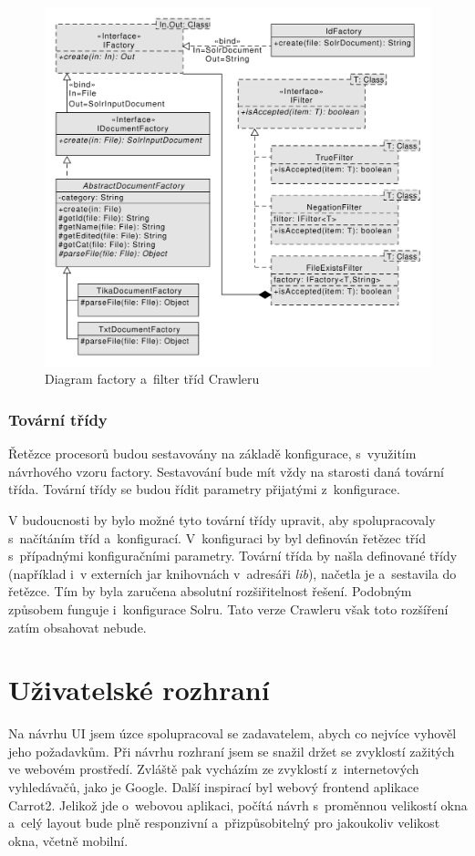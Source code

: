 \begin{figure}[h]
\begin{center}
\includegraphics[width=13cm]{OtherClasses}
\caption{Diagram factory a~filter tříd Crawleru}
\label{fig:OtherClasses}
\end{center}
\end{figure}

\subsubsection{Tovární třídy}
Řetězce procesorů budou sestavovány na základě konfigurace, s~využitím návrhového vzoru factory. Sestavování bude mít vždy na starosti daná tovární třída. Tovární třídy se budou řídit parametry přijatými z~konfigurace.

V budoucnosti by bylo možné tyto tovární třídy upravit, aby spolupracovaly s~načítáním tříd a~konfigurací. V~konfiguraci by byl definován řetězec tříd s~případnými konfiguračními parametry. Tovární třída by našla definované třídy (například i~v externích jar knihovnách v~adresáři \emph{lib}), načetla je a~sestavila do řetězce. Tím by byla zaručena absolutní rozšiřitelnost řešení. Podobným způsobem funguje i~konfigurace Solru. Tato verze Crawleru však toto rozšíření zatím obsahovat nebude.

\section{Uživatelské rozhraní} \label{design_frontend}
Na návrhu UI jsem úzce spolupracoval se zadavatelem, abych co nejvíce vyhověl jeho požadavkům. Při návrhu rozhraní jsem se snažil držet se zvyklostí zažitých ve webovém prostředí. Zvláště pak vycházím ze zvyklostí z~internetových vyhledávačů, jako je Google. Další inspirací byl webový frontend aplikace Carrot2. Jelikož jde o~webovou aplikaci, počítá návrh s~proměnnou velikostí okna a~celý layout bude plně responzivní a~přizpůsobitelný pro jakoukoliv velikost okna, včetně mobilní.

